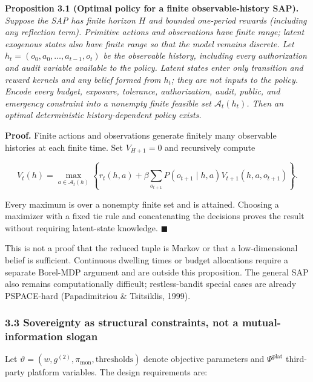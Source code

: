 \documentclass[
  11pt]{article}
\begin{document}
\textbf{Proposition 3.1 (Optimal policy for a finite observable-history
SAP).} \emph{Suppose the SAP has finite horizon \(H\) and bounded
one-period rewards (including any reflection term). Primitive actions
and observations have finite range; latent exogenous states also have
finite range so that the model remains discrete. Let
\(h_t=(o_0,a_0,\ldots,a_{t-1},o_t)\) be the observable history,
including every authorization and audit variable available to the
policy. Latent states enter only transition and reward kernels and any
belief formed from \(h_t\); they are not inputs to the policy. Encode
every budget, exposure, tolerance, authorization, audit, public, and
emergency constraint into a nonempty finite feasible set
\(\mathcal A_t(h_t)\). Then an optimal deterministic history-dependent
policy exists.}

\textbf{Proof.} Finite actions and observations generate finitely many
observable histories at each finite time. Set \(V_{H+1}=0\) and
recursively compute

\[V_t(h)=\max_{a\in\mathcal A_t(h)}\left\{r_t(h,a)+\beta\sum_{o_{t+1}}P(o_{t+1}\mid h,a)V_{t+1}(h,a,o_{t+1})\right\}.\]

Every maximum is over a nonempty finite set and is attained. Choosing a
maximizer with a fixed tie rule and concatenating the decisions proves
the result without requiring latent-state knowledge. \(\blacksquare\)

This is not a proof that the reduced tuple is Markov or that a
low-dimensional belief is sufficient. Continuous dwelling times or
budget allocations require a separate Borel-MDP argument and are outside
this proposition. The general SAP also remains computationally
difficult; restless-bandit special cases are already PSPACE-hard
(Papadimitriou \& Tsitsiklis, 1999).

\subsubsection{3.3 Sovereignty as structural constraints, not a
mutual-information
slogan}\label{sovereignty-as-structural-constraints-not-a-mutual-information-slogan}

Let \(\vartheta=(w,g^{(2)},\pi_{\mathrm{mon}},\text{thresholds})\)
denote objective parameters and \(\Psi^{\mathrm{plat}}\) third-party
platform variables. The design requirements are:
\end{document}

